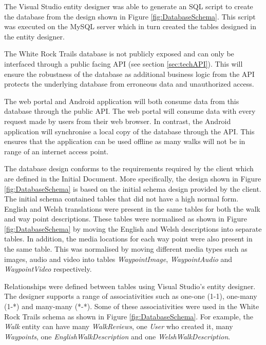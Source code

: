 \documentclass[11pt,a4paper]{article}
\begin{document}
The Visual Studio entity designer was able to generate an SQL script to create the database from the design shown in Figure \ref{fig:DatabaseSchema}. This script was executed on the MySQL server which in turn created the tables designed in the entity designer.

The White Rock Trails database is not publicly exposed and can only be interfaced through a public facing API (see section \ref{sec:techAPI}). 
This will ensure the robustness of the database as additional business logic from the API protects the underlying database from erroneous data and unauthorized access.

The web portal and Android application will both consume data from this database through the public API. 
The web portal will consume data with every request made by users from their web browser. 
In contrast, the Android application will synchronise a local copy of the database through the API. 
This ensures that the application can be used offline as many walks will not be in range of an internet access point.

The database design conforms to the requirements required by the client which are defined in the Initial Document. 
More specifically, the design shown in Figure \ref{fig:DatabaseSchema} is based on the initial schema design provided by the client. 
The initial schema contained tables that did not have a high normal form. 
English and Welsh translations were present in the same tables for both the walk and way point descriptions. 
These tables were normalised as shown in Figure \ref{fig:DatabaseSchema} by moving the English and Welsh descriptions into separate tables.
In addition, the media locations for each way point were also present in the same table.
This was normalised by moving different media types such as images, audio and video into tables \emph{WaypointImage}, \emph{WaypointAudio} and \emph{WaypointVideo} respectively.

Relationships were defined between tables using Visual Studio's entity designer. 
The designer supports a range of associativities such as one-one (1-1), one-many (1-*) and many-many (*-*). 
Some of these associativities were used in the White Rock Trails schema as shown in Figure \ref{fig:DatabaseSchema}.
For example, the \emph{Walk} entity can have many \emph{WalkReviews}, one \emph{User} who created it, many \emph{Waypoints}, one \emph{EnglishWalkDescription} and one \emph{WelshWalkDescription}.
\end{document}
